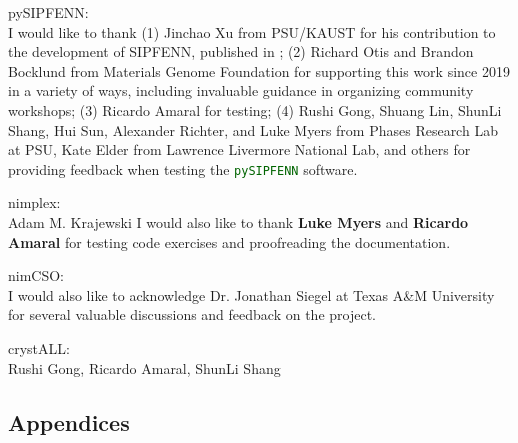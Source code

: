 \documentclass[letterpaper, 12pt]{report}
\let\oldtexttt\texttt
\renewcommand{\texttt}[1]{\oldtexttt{\textcolor{darkgreen}{#1}}}
\newcommand{\mypart}[1]{\thispagestyle{empty}\part*{#1}\addtocounter{page}{-1}}
\begin{document}
pySIPFENN:\\
I would like to thank (1) Jinchao Xu from PSU/KAUST for his contribution to the development of SIPFENN, published in \cite{Krajewski2022ExtensibleNetworks}; (2) Richard Otis and Brandon Bocklund from Materials Genome Foundation for supporting this work since 2019 in a variety of ways, including invaluable guidance in organizing community workshops; (3) Ricardo Amaral for testing; (4) Rushi Gong, Shuang Lin, ShunLi Shang, Hui Sun, Alexander Richter, and Luke Myers from Phases Research Lab at PSU, Kate Elder from Lawrence Livermore National Lab, and others for providing feedback when testing the \texttt{pySIPFENN} software.

nimplex:\\
Adam M. Krajewski 
I would also like to thank \textbf{Luke Myers} and \textbf{Ricardo Amaral} for testing code exercises and proofreading the documentation.

nimCSO:\\
I would also like to acknowledge Dr. Jonathan Siegel at Texas A\&M University for several valuable discussions and feedback on the project.

crystALL:\\
Rushi Gong, Ricardo Amaral, ShunLi Shang 



\newpage
\setlength\parindent{6pt} %


























\begin{appendices}

\mypart{Appendices}










\end{appendices}
\end{document}
